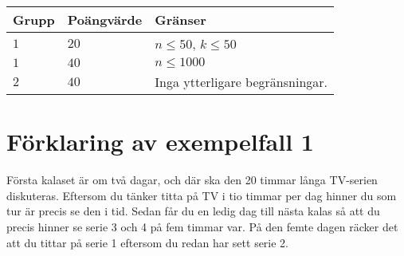 \noindent
\begin{tabular}{| l | l | l |}
\hline
Grupp & Poängvärde & Gränser \\ \hline
$1$   & $20$       & $n \leq 50$, $k \leq 50$ \\ \hline
$1$   & $40$       & $n \leq 1000$ \\ \hline
$2$   & $40$       & Inga ytterligare begränsningar. \\ \hline
\end{tabular}

\section*{Förklaring av exempelfall 1}
Första kalaset är om två dagar, och där ska den 20 timmar långa TV-serien diskuteras. Eftersom du tänker titta på TV i tio timmar per dag hinner du som tur är precis se den i tid. Sedan får du en ledig dag till nästa kalas så att du precis hinner se serie 3 och 4 på fem timmar var. På den femte dagen räcker det att du tittar på serie 1 eftersom du redan har sett serie 2.
